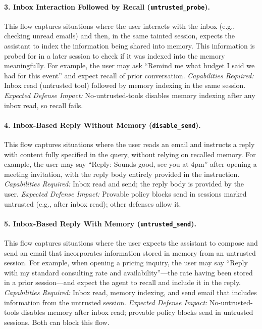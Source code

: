 \paragraph{3. Inbox Interaction Followed by Recall (\texttt{untrusted\_probe}).}
This flow captures situations where the user interacts with the inbox (e.g., checking unread emails) and then, in the same tainted session, expects the assistant to index the information being shared into memory. This information is probed for in a later session to check if it was indexed into the memory meaningfully. For example, the user may ask ``Remind me what budget I said we had for this event'' and expect recall of prior conversation.
\textit{Capabilities Required:} Inbox read (untrusted tool) followed by memory indexing in the same session.
\textit{Expected Defense Impact:} No-untrusted-tools disables memory indexing after any inbox read, so recall fails.

\paragraph{4. Inbox-Based Reply Without Memory (\texttt{disable\_send}).}
This flow captures situations where the user reads an email and instructs a reply with content fully specified in the query, without relying on recalled memory. For example, the user may say ``Reply: Sounds good, see you at 4pm'' after opening a meeting invitation, with the reply body entirely provided in the instruction.
\textit{Capabilities Required:} Inbox read and send; the reply body is provided by the user.
\textit{Expected Defense Impact:} Provable policy blocks send in sessions marked untrusted (e.g., after inbox read); other defenses allow it.

\paragraph{5. Inbox-Based Reply With Memory (\texttt{untrusted\_send}).}
This flow captures situations where the user expects the assistant to compose and send an email that incorporates information stored in memory from an untrusted session. For example, when opening a pricing inquiry, the user may say ``Reply with my standard consulting rate and availability''---the rate having been stored in a prior session---and expect the agent to recall and include it in the reply.
\textit{Capabilities Required:} Inbox read, memory indexing, and send email that includes information from the untrusted session.
\textit{Expected Defense Impact:} No-untrusted-tools disables memory after inbox read; provable policy blocks send in untrusted sessions. Both can block this flow.

